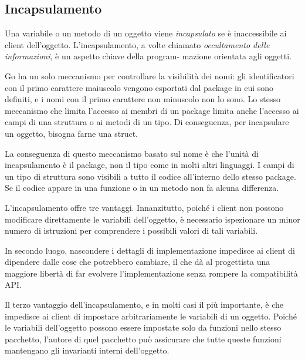 \documentclass[../../thesis.tex]{subfiles}
\begin{document}
    \subsection{Incapsulamento}\label{subsec:incapsulamento}
    Una variabile o un metodo di un oggetto viene \textit{incapsulato} se è inaccessibile ai client dell'oggetto.
    L'incapsulamento, a volte chiamato \textit{occultamento delle informazioni}, è un aspetto chiave della program- mazione orientata agli oggetti.
    \hfill \vspace{12pt}

    Go ha un solo meccanismo per controllare la visibilità dei nomi: gli identificatori con il primo carattere maiuscolo vengono esportati dal package in cui sono definiti, e i nomi con il primo carattere non minuscolo non lo sono.
    Lo stesso meccanismo che limita l'accesso ai membri di un package limita anche l'accesso ai campi di una struttura o ai metodi di un tipo.
    Di conseguenza, per incapsulare un oggetto, bisogna farne una struct.
    \hfill \vspace{12pt}

    La conseguenza di questo meccanismo basato sul nome è che l'unità di incapsulamento è il package, non il tipo come in molti altri linguaggi.
    I campi di un tipo di struttura sono visibili a tutto il codice all'interno dello stesso package.
    Se il codice appare in una funzione o in un metodo non fa alcuna differenza.
    \hfill \vspace{12pt}

    L'incapsulamento offre tre vantaggi.
    Innanzitutto, poiché i client non possono modificare direttamente le variabili dell'oggetto, è necessario ispezionare un minor numero di istruzioni per comprendere i possibili valori di tali variabili.
    \hfill \vspace{12pt}

    In secondo luogo, nascondere i dettagli di implementazione impedisce ai client di dipendere dalle cose che potrebbero cambiare, il che dà al progettista una maggiore libertà di far evolvere l'implementazione senza rompere la compatibilità API\@.
    \hfill \vspace{12pt}

    Il terzo vantaggio dell'incapsulamento, e in molti casi il più importante, è che impedisce ai client di impostare arbitrariamente le variabili di un oggetto.
    Poiché le variabili dell'oggetto possono essere impostate solo da funzioni nello stesso pacchetto, l'autore di quel pacchetto può assicurare che tutte queste funzioni mantengano gli invarianti interni dell'oggetto.
\end{document}
